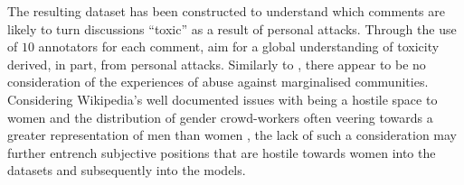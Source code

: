 The resulting dataset has been constructed to understand which comments are likely to turn discussions ``toxic'' as a result of personal attacks. Through the use of $10$ annotators for each comment, \citet{Wulczyn:2017} aim for a global understanding of toxicity derived, in part, from personal attacks.
Similarly to \citet{Davidson:2017}, there appear to be no consideration of the experiences of abuse against marginalised communities.
Considering Wikipedia's well documented issues with being a hostile space to women \citep{Torres:2016} and the distribution of gender crowd-workers often veering towards a greater representation of men than women \citep{Posch:2018}, the lack of such a consideration may further entrench subjective positions that are hostile towards women into the datasets and subsequently into the models.

